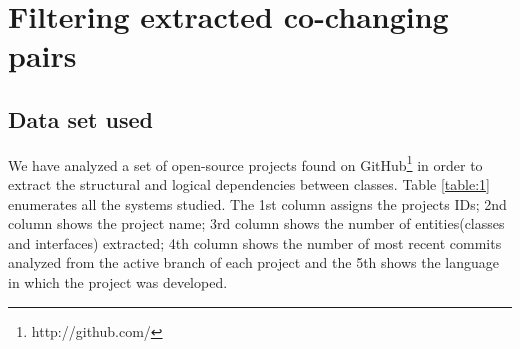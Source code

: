 \documentclass[12pt]{mitthesis}
\begin{document}
\chapter {Filtering extracted co-changing pairs}

\section{Data set used}
\label{sec:dataset}
We have analyzed a set of open-source projects found on GitHub\footnote{http://github.com/} \cite{Kalliamvakou2016} in order to extract the structural and logical dependencies between classes. Table \ref{table:1} enumerates all the systems studied. The 1st column assigns the projects IDs; 2nd column shows the project name; 3rd column shows the number of entities(classes and interfaces) extracted; 4th column shows the number of most recent commits analyzed from the active branch of each project and the 5th shows the language in which the project was developed.
\end{document}
